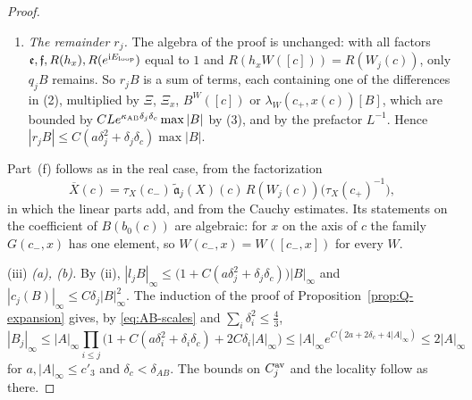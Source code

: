 \begin{proof}
\begin{enumerate}[label=(\arabic*)]
\item \emph{The remainder $r_j$.} The algebra of the proof is unchanged: with all factors $\mathfrak e,\mathfrak f,R(h_x),R(e^{\mathrm i E_{\rm loop}})$ equal to $1$ and $R(h_xW([c]))=R(W_j(c))$, only $q_jB$ remains. So $r_jB$ is a sum of terms, each containing one of the differences in (2), multiplied by $\Xi$, $\Xi_x$, $B^W([c])$ or $\lambda_W(c_+,x(c))[B]$, which are bounded by $CLe^{\kappa_{\rm AB}\delta_j\delta_c}\max|B|$ by (3), and by the prefactor $L^{-1}$. Hence $|r_jB|\le C(a\delta_j^2+\delta_j\delta_c)\max|B|$.
\end{enumerate}
Part~(f) follows as in the real case, from the factorization
\[
\overline X(c)=\tau_X(c_-)\,\tilde{\mathfrak a}_j(X)(c)\,R(W_j(c))\big(\tau_X(c_+)^{-1}\big),
\]
in which the linear parts add, and from the Cauchy estimates. Its statements on the coefficient of $B(b_0(c))$ are algebraic: for $x$ on the axis of $c$ the family $G(c_-,x)$ has one element, so $W(c_-,x)=W([c_-,x])$ for every $W$.

(iii) \emph{(a), (b).} By (ii), $|l_jB|_\infty\le\big(1+C(a\delta_j^2+\delta_j\delta_c)\big)|B|_\infty$ and $|c_j(B)|_\infty\le C\delta_j|B|^2_\infty$. The induction of the proof of Proposition~\ref{prop:Q-expansion} gives, by \eqref{eq:AB-scales} and $\sum_i\delta_i^2\le\frac43$,
\[
|B_j|_\infty\le|A|_\infty\prod_{i\le j}\big(1+C(a\delta_i^2+\delta_i\delta_c)+2C\delta_i|A|_\infty\big)\le|A|_\infty e^{C(2a+2\delta_c+4|A|_\infty)}\le2|A|_\infty
\]
for $a,|A|_\infty\le c'_3$ and $\delta_c<\delta_{AB}$. The bounds on $C^{\rm av}_j$ and the locality follow as there.


\end{proof}
